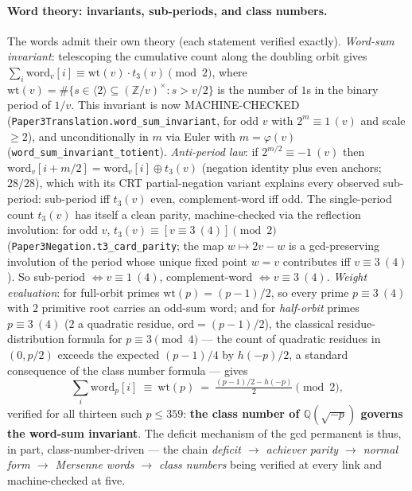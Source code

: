 \documentclass[11pt]{article}
\theoremstyle{remark}\newtheorem{remark}[theorem]{Remark}
\begin{document}
\paragraph{Word theory: invariants, sub-periods, and class numbers.} The words admit their own
theory (each statement verified exactly). \emph{Word-sum invariant}: telescoping the cumulative
count along the doubling orbit gives $\sum_i\mathrm{word}_v[i]\equiv \mathrm{wt}(v)\cdot
t_3(v)\pmod2$, where $\mathrm{wt}(v)=\#\{s\in\langle2\rangle\subseteq(\mathbb Z/v)^\times:
s>v/2\}$ is the number of $1$s in the binary period of $1/v$. This invariant is now MACHINE-CHECKED (\texttt{Paper3Translation.word\_sum\_invariant}, for odd $v$ with $2^{m}\equiv1\,(v)$ and scale $\ge2$), and unconditionally in $m$ via Euler with $m=\varphi(v)$ (\texttt{word\_sum\_invariant\_totient}).
\emph{Anti-period law}: if $2^{m/2}\equiv-1\ (v)$ then $\mathrm{word}_v[i+m/2]=
\mathrm{word}_v[i]\oplus t_3(v)$ (negation identity plus even anchors; $28/28$), which with its CRT
partial-negation variant explains every observed sub-period: sub-period iff $t_3(v)$ even,
complement-word iff odd. The single-period count $t_3(v)$ has itself a clean parity, machine-checked
via the reflection involution: for odd $v$, $t_3(v)\equiv[v\equiv3\ (4)]\pmod2$
(\texttt{Paper3Negation.t3\_card\_parity}; the map $w\mapsto2v-w$ is a gcd-preserving involution of the
period whose unique fixed point $w=v$ contributes iff $v\equiv3\ (4)$). So sub-period $\iff
v\equiv1\ (4)$, complement-word $\iff v\equiv3\ (4)$. \emph{Weight evaluation}: for full-orbit primes $\mathrm{wt}(p)=(p{-}1)/2$,
so every prime $p\equiv3\ (4)$ with $2$ primitive root carries an odd-sum word; and for
\emph{half-orbit} primes $p\equiv3\ (4)$ ($2$ a quadratic residue, $\mathrm{ord}=(p{-}1)/2$), the
classical residue-distribution formula for $p\equiv3\pmod4$ --- the count of quadratic residues in
$(0,p/2)$ exceeds the expected $(p-1)/4$ by $h(-p)/2$, a standard consequence of the class number
formula \cite[\S6]{Dav} --- gives
\[
   \sum_i \mathrm{word}_p[i]\ \equiv\ \mathrm{wt}(p)\ =\ \tfrac{(p-1)/2-h(-p)}{2}\pmod 2,
\]
verified for all thirteen such $p\le359$: \textbf{the class number of $\mathbb Q(\sqrt{-p})$ governs
the word-sum invariant}. The deficit mechanism of the gcd permanent is thus, in part,
class-number-driven --- the chain \emph{deficit $\to$ achiever parity $\to$ normal form $\to$
Mersenne words $\to$ class numbers} being verified at every link and machine-checked at five.
\end{document}
